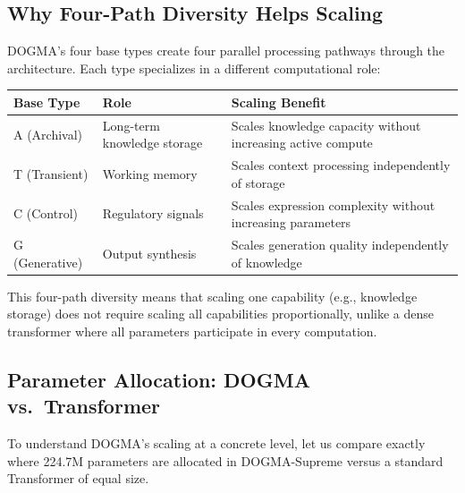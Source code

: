 \subsection{Why Four-Path Diversity Helps Scaling}

DOGMA's four base types create four parallel processing pathways through the architecture. Each type specializes in a different computational role:

\begin{center}
\renewcommand{\arraystretch}{1.15}
\begin{tabularx}{0.95\textwidth}{l l Y}
\toprule
\textbf{Base Type} & \textbf{Role} & \textbf{Scaling Benefit} \\
\midrule
\textsf{A} (Archival) & Long-term knowledge storage & Scales knowledge capacity without increasing active compute \\
\textsf{T} (Transient) & Working memory & Scales context processing independently of storage \\
\textsf{C} (Control) & Regulatory signals & Scales expression complexity without increasing parameters \\
\textsf{G} (Generative) & Output synthesis & Scales generation quality independently of knowledge \\
\bottomrule
\end{tabularx}
\end{center}

This four-path diversity means that scaling one capability (e.g., knowledge storage) does not require scaling all capabilities proportionally, unlike a dense transformer where all parameters participate in every computation.

\subsection{Parameter Allocation: DOGMA vs.\ Transformer}

To understand DOGMA's scaling at a concrete level, let us compare exactly where 224.7M parameters are allocated in DOGMA-Supreme versus a standard Transformer of equal size.

